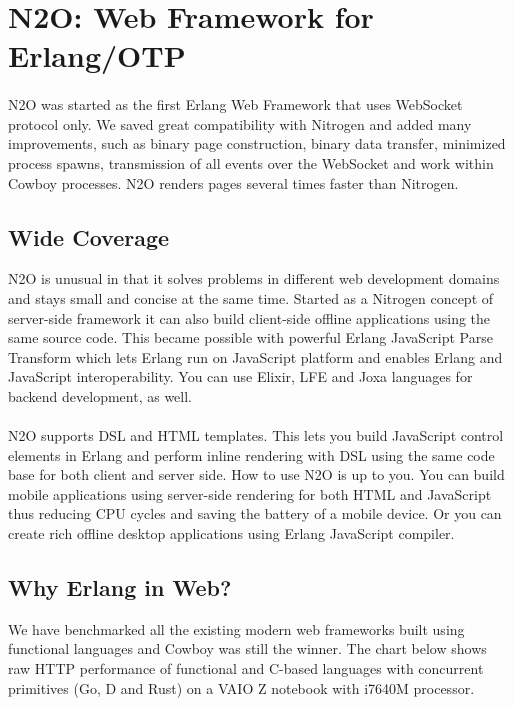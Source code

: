 \section{N2O: Web Framework for Erlang/OTP}

\paragraph{}
N2O was started as the first Erlang Web Framework
that uses WebSocket protocol only. We saved great compatibility with Nitrogen
and added many improvements, such as binary page construction,
binary data transfer, minimized process spawns, transmission of all events over the WebSocket
and work within Cowboy processes. N2O renders pages several times faster than Nitrogen.

\subsection{Wide Coverage}
N2O is unusual in that it solves problems in different web development domains
and stays small and concise at the same time. Started as a Nitrogen concept
of server-side framework it can also build client-side offline applications
using the same source code. This became possible with powerful Erlang JavaScript Parse
Transform which lets Erlang run on JavaScript platform and enables Erlang and JavaScript
interoperability. You can use Elixir, LFE and Joxa languages for backend development, as well.

\paragraph{}
N2O supports DSL and HTML templates. This lets you build JavaScript
control elements in Erlang and perform inline rendering with DSL using
the same code base for both client and server side.
How to use N2O is up to you. You can build mobile applications using server-side rendering
for both HTML and JavaScript thus reducing CPU cycles and saving the battery of a mobile device.
Or you can create rich offline desktop applications using Erlang JavaScript compiler.

\newpage
\subsection*{Why Erlang in Web?}
We have benchmarked all the existing modern web frameworks built using functional
languages and Cowboy was still the winner. The chart below shows raw HTTP
performance of functional and C-based languages with concurrent
primitives (Go, D and Rust) on a VAIO Z notebook with i7640M processor.

